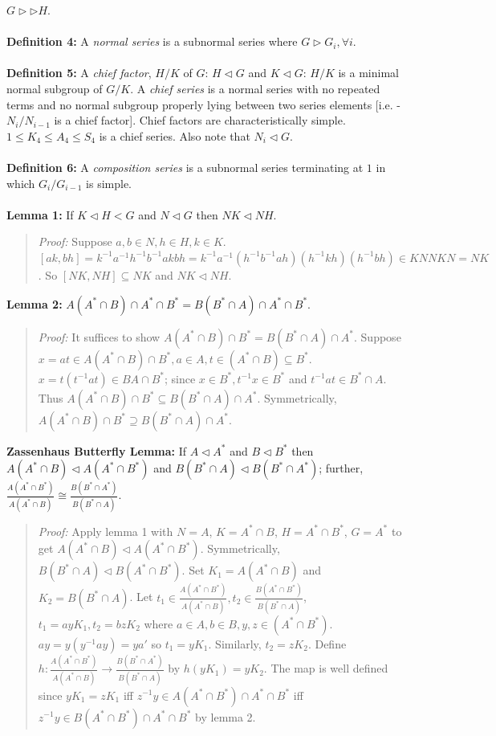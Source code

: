 $G \rhd \rhd H$.
\\
\\
{\bf Definition 4:}
A \emph{normal series} is a subnormal series where $G \rhd G_i, \forall i$.
\\
\\
{\bf Definition 5:}
A \emph{chief factor}, $H/K$ of $G$: $H \lhd G$ and $K \lhd G$: $H/K$ is a minimal normal subgroup of $G/K$.
A \emph{chief series} is a normal series with no repeated terms and no normal subgroup properly
lying between two series elements [i.e. - $N_i/N_{i-1}$ is a chief factor].  Chief factors are
characteristically simple. $1 \leq K_4 \leq A_4 \leq S_4$ is a chief series.  Also note that
$N_i \lhd G$.
\\
\\
{\bf Definition 6:}
A \emph{composition series} is a subnormal series 
terminating at $1$ in which $G_i/G_{i-1}$ is simple.
\\
\\
{\bf Lemma 1:} If $K \lhd H <G$ and $N \lhd G$ then $NK \lhd NH$.
\begin{quote}
\emph{Proof:}  
Suppose $a, b \in N, h \in H, k \in K$.
$[ak,bh]= 
k^{-1} a^{-1}h^{-1}b^{-1} ak bh= 
k^{-1} a^{-1} (h^{-1}b^{-1} a h) 
(h^{-1}kh) (h^{-1} bh) \in K N N K N = NK$.  So $[NK,NH] \subseteq NK$ and $NK \lhd NH$.
\end{quote}
{\bf Lemma 2:}
$A(A^* \cap B) \cap A^* \cap B^*= B(B^* \cap A) \cap A^* \cap B^*$.
\begin{quote}
\emph{Proof:}  
It suffices to show
$A(A^* \cap B) \cap B^*= B(B^* \cap A) \cap A^*$.
Suppose $x=at \in A(A^* \cap B) \cap B^* , a \in A, t \in (A^* \cap B) \subseteq B^*$.
$x= t (t^{-1}at) \in BA \cap B^*$; since $x \in B^*, t^{-1} x \in B^*$
and $t^{-1} a t \in B^* \cap A$. Thus 
$A(A^* \cap B) \cap B^* \subseteq B(B^* \cap A) \cap A^*$.
Symmetrically, $A(A^* \cap B) \cap B^* \supseteq B(B^* \cap A) \cap A^*$.
\end{quote}
{\bf Zassenhaus Butterfly Lemma:}  If
$A \triangleleft A^{*}$ and $B \triangleleft B^{*}$ then
$A(A^{*} \cap B) \triangleleft A(A^{*} \cap B^{*})$ and
$B(B^{*} \cap A) \triangleleft B(B^{*} \cap A^{*})$; further,
${\frac {A(A^{*} \cap B^{*})} {A(A^{*} \cap B) }} \cong
{\frac {B(B^{*} \cap A^{*})} {B(B^{*} \cap A) }}$.
\begin{quote}
\emph{Proof:}  
Apply lemma 1 with $N=A$, $K=A^* \cap B$, $H= A^* \cap B^*$, $G=A^*$ to get
$A(A^* \cap B) \lhd A(A^* \cap B^*)$.  Symmetrically,
$B(B^* \cap A) \lhd B(A^* \cap B^*)$.  
Set $K_1= A(A^* \cap B)$ and $K_2= B(B^* \cap A)$.  Let 
$t_1 \in {\frac {A(A^{*} \cap B^{*})} {A(A^{*} \cap B) }}, 
t_2 \in {\frac {B(A^{*} \cap B^{*})} {B(B^{*} \cap A) }}$, $t_1=ayK_1, t_2=bzK_2$ where
$a \in A, b \in B, y, z \in (A^* \cap B^*)$.
$ay= y (y^{-1}ay)= ya'$ so $t_1= yK_1$.  Similarly, $t_2= zK_2$.
Define $h:
{\frac {A(A^{*} \cap B^{*})} {A(A^{*} \cap B) }} \rightarrow
{\frac {B(B^{*} \cap A^{*})} {B(B^{*} \cap A) }}$ by $h(yK_1)= y K_2$.  The map is
well defined since $yK_1=zK_1$ iff $z^{-1}y \in A(A^* \cap B^*) \cap A^* \cap B^*$
iff
$z^{-1}y \in B(A^* \cap B^*) \cap A^* \cap B^*$ by lemma 2.
\end{quote}
